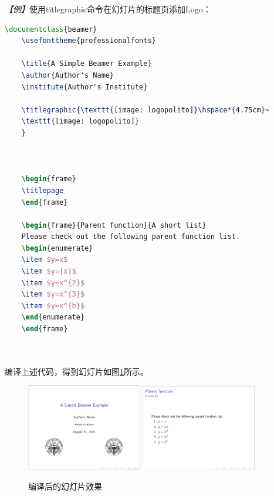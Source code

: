\emph{【例】}使用titlegraphic命令在幻灯片的标题页添加Logo：
\begin{lstlisting}[language=TeX]
    \documentclass{beamer}
    \usefonttheme{professionalfonts}

    \title{A Simple Beamer Example}
    \author{Author's Name}
    \institute{Author's Institute}

    \titlegraphic{\texttt{[image: logopolito]}\hspace*{4.75cm}~
    \texttt{[image: logopolito]}
    }

    

    \begin{frame}
    \titlepage
    \end{frame}

    \begin{frame}{Parent function}{A short list}
    Please check out the following parent function list.
    \begin{enumerate}
    \item $y=x$
    \item $y=|x|$
    \item $y=x^{2}$
    \item $y=x^{3}$
    \item $y=x^{b}$
    \end{enumerate}
    \end{frame}

    
\end{lstlisting}

编译上述代码，得到幻灯片如图\ref{fig:935}所示。

\begin{figure}[htbp]
    \centering
    \includegraphics[width = 0.45\textwidth]{images/ch_9/example_sec2_8_0.png}
    \includegraphics[width = 0.45\textwidth]{images/ch_9/example_sec2_8_1.png}
    \caption{编译后的幻灯片效果}
    \label{fig:935}
\end{figure}

